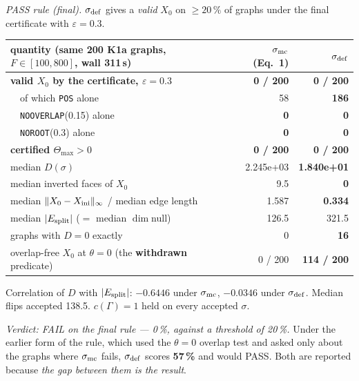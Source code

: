 \documentclass[10pt,a4paper]{article}
\begin{document}
\emph{PASS rule (final).} $\sigma_{\rm def}$ gives a \emph{valid} $X_0$ on $\ge20\,\%$ of graphs
under the final certificate with $\varepsilon = 0.3$.

\begin{center}\small
\begin{tabular}{@{}lrr@{}}
\toprule
quantity (same 200 K1a graphs, $F\in[100,800]$, wall 311\,s) & $\sigma_{\rm mc}$ (Eq.~1) & $\sigma_{\rm def}$ \\
\midrule
\textbf{valid $X_0$ by the certificate, $\varepsilon = 0.3$} & \textbf{0 / 200} & \textbf{0 / 200} \\
\ \ of which \texttt{POS} alone & 58 & \textbf{186} \\
\ \ \texttt{NOOVERLAP}(0.15) alone & \textbf{0} & \textbf{0} \\
\ \ \texttt{NOROOT}(0.3) alone & \textbf{0} & \textbf{0} \\
\textbf{certified $\Theta_{\max}>0$} & \textbf{0 / 200} & \textbf{0 / 200} \\
median $D(\sigma)$ & 2.245e+03 & \textbf{1.840e+01} \\
median inverted faces of $X_0$ & 9.5 & \textbf{0} \\
median $\|X_0 - X_{\rm ini}\|_\infty$ / median edge length & 1.587 & \textbf{0.334} \\
median $|E_{\rm split}|$ ($=$ median $\dim$null) & 126.5 & 321.5 \\
graphs with $D = 0$ exactly & 0 & \textbf{16} \\
overlap-free $X_0$ at $\theta=0$ (the \textbf{withdrawn} predicate) & 0 / 200 & \textbf{114 / 200} \\
\bottomrule
\end{tabular}
\end{center}

Correlation of $D$ with $|E_{\rm split}|$: $-0.6446$ under $\sigma_{\rm mc}$, $-0.0346$ under
$\sigma_{\rm def}$. Median flips accepted 138.5. $c(\Gamma)=1$ held on every accepted $\sigma$.

\emph{Verdict: FAIL on the final rule --- 0\,\%, against a threshold of 20\,\%.} Under the
earlier form of the rule, which used the $\theta=0$ overlap test and asked only about the graphs
where $\sigma_{\rm mc}$ fails, $\sigma_{\rm def}$ scores \textbf{57\,\%} and would PASS. Both are
reported because \emph{the gap between them is the result}.
\end{document}
